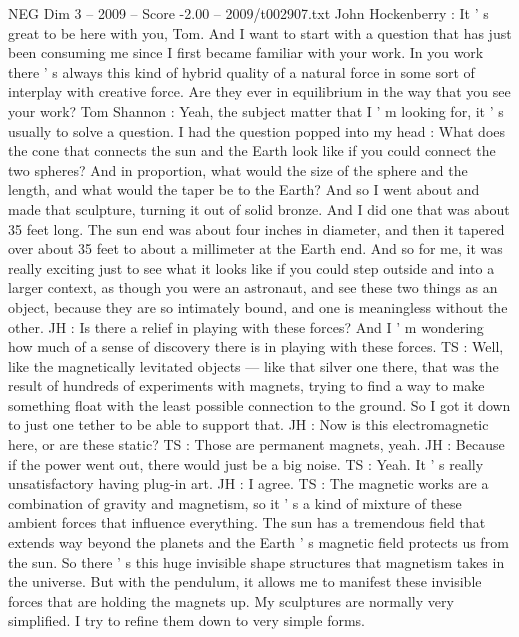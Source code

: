 \begin{textsample}{NEG Dim 3 – 2009 – Score -2.00 – 2009/t002907.txt}  \label{ex:f3_neg_028}
John Hockenberry : It ' s great to be here with you, Tom.
And I want to start with a question that has just been consuming me since I first became familiar with your work.
In you work there ' s always this kind of hybrid quality of a natural force in some sort of interplay with creative force.
Are they ever in equilibrium in the way that you see your work?
Tom Shannon : Yeah, the subject matter that I ' m looking for, it ' s usually to solve a question.
I had the question popped into my head : What does the cone that connects the sun and the Earth look like if you could connect the two spheres?
And in proportion, what would the size of the sphere and the length, and what would the taper be to the Earth?
And so I went about and made that sculpture, turning it out of solid bronze.
And I did one that was about 35 feet long.
The sun end was about four inches in diameter, and then it tapered over about 35 feet to about a millimeter at the Earth end.
And so for me, it was really exciting just to see what it looks like if you could step outside and into a larger context, as though you were an astronaut, and see these two things as an object, because they are so intimately bound, and one is meaningless without the other.
JH : Is there a relief in playing with these forces?
And I ' m wondering how much of a sense of discovery there is in playing with these forces.
TS : Well, like the magnetically levitated objects — like that silver one there, that was the result of hundreds of experiments with magnets, trying to find a way to make something float with the least possible connection to the ground.
So I got it down to just one tether to be able to support that.
JH : Now is this electromagnetic here, or are these static?
TS : Those are permanent magnets, yeah.
JH : Because if the power went out, there would just be a big noise.
TS : Yeah.
It ' s really unsatisfactory having plug-in art.
JH : I agree.
TS : The magnetic works are a combination of gravity and magnetism, so it ' s a kind of mixture of these ambient forces that influence everything.
The sun has a tremendous field that extends way beyond the planets and the Earth ' s magnetic field protects us from the sun.
So there ' s this huge invisible shape structures that magnetism takes in the universe.
But with the pendulum, it allows me to manifest these invisible forces that are holding the magnets up.
My sculptures are normally very simplified.
I try to refine them down to very simple forms.

\end{textsample}
